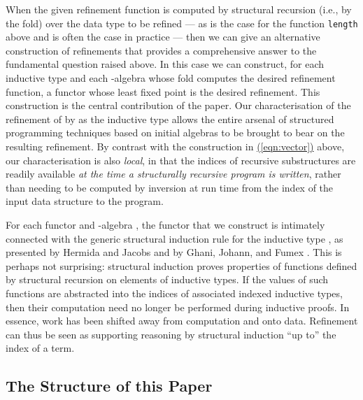 \documentclass{LMCS}
\newcommand{\parenref}[1]{\hyperref[#1]{(\ref*{#1})}}
\begin{document}
When the given refinement function is computed by structural recursion
(i.e., by the fold) over the data type to be refined --- as is the
case for the function \verb|length| above and is often the case in
practice --- then we can give an alternative construction of
refinements that provides a comprehensive answer to the fundamental
question raised above.  In this case we can construct, for each
inductive type  and each -algebra  whose fold
computes the desired refinement function, a functor  whose
least fixed point  is the desired refinement. This
construction is the central contribution of the paper.  Our
characterisation of the refinement of  by  as the
inductive type  allows the entire arsenal of structured
programming techniques based on initial algebras to be brought to bear
on the resulting refinement. By contrast with the construction
in \parenref{eqn:vector} above, our characterisation is also {\em
  local}, in that the indices of recursive substructures are readily
available {\em at the time a structurally recursive program is
  written}, rather than needing to be computed by inversion at run
time from the index of the input data structure to the program.

For each functor  and -algebra , the functor
 that we construct is intimately connected with the
generic structural induction rule for the inductive type , as
presented by Hermida and Jacobs \cite{hermida98structural} and by
Ghani, Johann, and Fumex \cite{ghani10induction}. This is perhaps not
surprising: structural induction proves properties of functions
defined by structural recursion on elements of inductive types. If the
values of such functions are abstracted into the indices of associated
indexed inductive types, then their computation need no longer be
performed during inductive proofs. In essence, work has been shifted
away from computation and onto data. Refinement can thus be seen as
supporting reasoning by structural induction ``up to'' the index of a
term.

\subsection{The Structure of this Paper}
\end{document}
